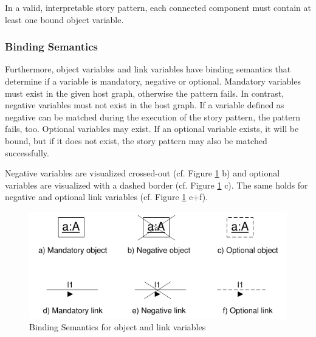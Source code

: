 In a valid, interpretable story pattern, each connected component must contain
at least one bound object variable.



\subsubsection{Binding Semantics}
\label{sec:StoryPatterns:binding:semantics}
Furthermore, object variables and link variables have binding semantics that
determine if a variable is mandatory, negative or optional.
Mandatory variables must exist in the given host graph, otherwise the pattern
fails. 
In contrast, negative variables must not exist in the host graph. If a variable
defined as negative can be matched during the execution of the story pattern,
the pattern fails, too.
Optional variables may exist. If an optional variable exists, it will be
bound, but if it does not exist, the story pattern may also be matched
successfully.

Negative variables are visualized crossed-out (cf. Figure
\ref{fig:bindingSemanticsOverview} b) and optional variables are visualized with
a dashed border (cf. Figure \ref{fig:bindingSemanticsOverview} c).
The same holds for negative and optional link variables (cf. Figure
\ref{fig:bindingSemanticsOverview} e+f).

\begin{figure}[htbp]
  \centering
  \includegraphics[scale=1.2]{figures/BindingSemanticsOverview}
  \caption{Binding Semantics for object and link variables}
  \label{fig:bindingSemanticsOverview}
\end{figure}


